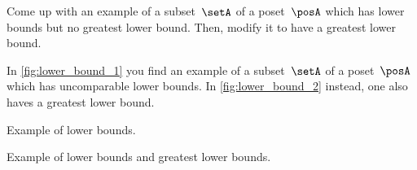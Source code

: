 \begin{exercise}
    Come up with an example of a subset~$\setA$ of a poset~$\posA$ which has lower bounds but no greatest lower bound.
    Then, modify it to have a greatest lower bound.
\end{exercise}

\begin{solution}
    In \cref{fig:lower_bound_1} you find an example of a subset~$\setA$ of a poset~$\posA$ which has uncomparable lower bounds.
    In \cref{fig:lower_bound_2} instead, one also haves a greatest lower bound.
    \begin{marginfigure}
        \centering
        \caption{Example of lower bounds. \label{fig:lower_bound_1}}
    \end{marginfigure}
    \begin{marginfigure}
        \centering
        \caption{Example of lower bounds and greatest lower bounds. \label{fig:lower_bound_2}}
    \end{marginfigure}
\end{solution}
